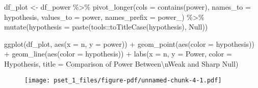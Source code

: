 \documentclass[
  11pt,
  letterpaper,
  DIV=11,
  numbers=noendperiod]{scrartcl}
\newenvironment{Shaded}{}{}
\newcommand{\AttributeTok}[1]{\textcolor[rgb]{0.84,0.60,0.13}{#1}}
\newcommand{\FunctionTok}[1]{\textcolor[rgb]{0.41,0.62,0.42}{#1}}
\newcommand{\NormalTok}[1]{\textcolor[rgb]{0.24,0.22,0.21}{#1}}
\newcommand{\OtherTok}[1]{\textcolor[rgb]{0.41,0.62,0.42}{#1}}
\newcommand{\SpecialCharTok}[1]{\textcolor[rgb]{0.69,0.38,0.53}{#1}}
\newcommand{\StringTok}[1]{\textcolor[rgb]{0.60,0.59,0.10}{#1}}
\begin{document}
\begin{Shaded}
\begin{Highlighting}[]
\NormalTok{df\_plot }\OtherTok{\textless{}{-}} 
\NormalTok{  df\_power }\SpecialCharTok{\%\textgreater{}\%} 
  \FunctionTok{pivot\_longer}\NormalTok{(}\AttributeTok{cols =} \FunctionTok{contains}\NormalTok{(}\StringTok{\textquotesingle{}power\textquotesingle{}}\NormalTok{),}
               \AttributeTok{names\_to =} \StringTok{\textquotesingle{}hypothesis\textquotesingle{}}\NormalTok{,}
               \AttributeTok{values\_to =} \StringTok{\textquotesingle{}power\textquotesingle{}}\NormalTok{,}
               \AttributeTok{names\_prefix =} \StringTok{\textquotesingle{}power\_\textquotesingle{}}\NormalTok{) }\SpecialCharTok{\%\textgreater{}\%} 
  \FunctionTok{mutate}\NormalTok{(}\StringTok{\textquotesingle{}hypothesis\textquotesingle{}} \OtherTok{=} \FunctionTok{paste}\NormalTok{(tools}\SpecialCharTok{::}\FunctionTok{toTitleCase}\NormalTok{(hypothesis), }\StringTok{\textquotesingle{}Null\textquotesingle{}}\NormalTok{))}

\FunctionTok{ggplot}\NormalTok{(df\_plot, }\FunctionTok{aes}\NormalTok{(}\AttributeTok{x =}\NormalTok{ n, }\AttributeTok{y =}\NormalTok{ power)) }\SpecialCharTok{+} 
  \FunctionTok{geom\_point}\NormalTok{(}\FunctionTok{aes}\NormalTok{(}\AttributeTok{color =}\NormalTok{ hypothesis)) }\SpecialCharTok{+} 
  \FunctionTok{geom\_line}\NormalTok{(}\FunctionTok{aes}\NormalTok{(}\AttributeTok{color =}\NormalTok{ hypothesis)) }\SpecialCharTok{+} 
  \FunctionTok{labs}\NormalTok{(}\AttributeTok{x =} \StringTok{\textquotesingle{}n\textquotesingle{}}\NormalTok{,}
       \AttributeTok{y =} \StringTok{\textquotesingle{}Power\textquotesingle{}}\NormalTok{,}
       \AttributeTok{color =} \StringTok{\textquotesingle{}Hypothesis\textquotesingle{}}\NormalTok{,}
       \AttributeTok{title =} \StringTok{\textquotesingle{}Comparison of Power Between}\SpecialCharTok{\textbackslash{}n}\StringTok{Weak and Sharp Null\textquotesingle{}}\NormalTok{)}
\end{Highlighting}
\end{Shaded}

\begin{figure}[H]

{\centering \texttt{[image: pset\_1\_files/figure-pdf/unnamed-chunk-4-1.pdf]}

}

\end{figure}
\end{document}
